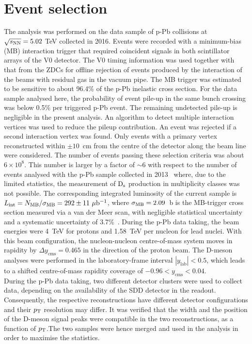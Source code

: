 \section{Event selection}
\label{sec:EvSelpPb}
The analysis was performed on the data sample of p-Pb collisions at $\sqrt{s_{\rm NN}}=5.02$ TeV
collected in 2016.
Events were recorded with a minimum-bias (MB) interaction trigger 
that required coincident signals in both scintillator arrays of the V0 detector.
The V0 timing information was used together with that from the ZDCs for offline rejection 
of events produced by the interaction of the beams with residual gas in the vacuum pipe.
The MB trigger was estimated to be sensitive to about 96.4\% of the p-Pb inelastic cross section.
For the data sample analysed here, the probability of event pile-up in the 
same bunch crossing was below 0.5\% per triggered p-Pb event.
The remaining undetected pile-up is negligible in the present analysis.
An algorithm to detect multiple interaction vertices was used to reduce
the pileup contribution. An event was rejected if a second
interaction vertex was found. Only events with a primary vertex reconstructed within $\pm 10$~cm from the 
centre of the detector along the beam line were considered. 
The number of events passing these selection criteria was about $6\times 10^8$.
This number is larger by a factor of $\sim$6 with respect to the number of events analysed with the p-Pb sample collected in 
2013~\cite{Abelev:2014hha,Adam:2016mkz,Adam:2016ich} where, due to the limited statistics, the measurement of ${\rm D_s}$ production
in multiplicity classes was not possible. 
The corresponding integrated luminosity of the current sample is 
$L_{\rm int} =N_{\rm MB}/\sigma_{\rm MB}=292 \pm 11~\mu{\rm b}^{-1}$,
where $\sigma_{\rm MB}=2.09$~b is the MB-trigger cross section  
measured via a van der Meer scan, with negligible statistical uncertainty 
and a systematic uncertainty of 3.7\%~\cite{Abelev:2014epa}.
During the p-Pb data taking, the beam energies were 4~TeV for 
protons and 1.58~TeV per nucleon for lead nuclei. 
With this beam configuration, the nucleon-nucleon centre-of-mass system 
moves in rapidity by $\Delta y_{\mathrm{cms}}=0.465$ in the direction 
of the proton beam. The D-meson analyses were performed in 
the laboratory-frame interval $|y_{\mathrm{lab}}|<0.5$, 
which leads to a shifted centre-of-mass rapidity coverage 
of $-0.96 < y_{\mathrm{cms}} < 0.04$.\\


During the p-Pb data taking, two different detector clusters were used to collect data, depending on the 
availability of the SDD detector in the readout. Consequently, the respective reconstructions have different
detector configurations and their $p_{\rm T}$ resolution may differ. It was verified that the 
width and the position of the D-meson signal peaks were compatible in the two
reconstructions, as a function of $p_{\rm T}$.The two samples were hence merged and 
used in the analysis in order to maximise the statistics.

